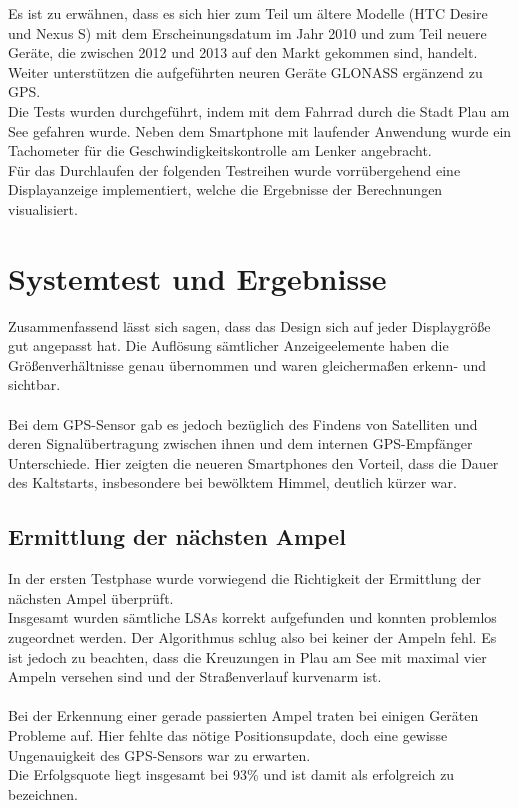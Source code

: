 Es ist zu erwähnen, dass es sich hier zum Teil um ältere Modelle (HTC Desire und Nexus S) mit dem Erscheinungsdatum im Jahr 2010 und zum Teil neuere Geräte, die zwischen 2012 und 2013 auf den Markt gekommen sind, handelt. Weiter unterstützen die aufgeführten neuren Geräte \gls{GLONASS} ergänzend zu \gls{GPS}.\\
Die Tests wurden durchgeführt, indem mit dem Fahrrad durch die Stadt Plau am See gefahren wurde. Neben dem \gls{Smartphone} mit laufender Anwendung wurde ein Tachometer für die Geschwindigkeitskontrolle am Lenker angebracht. \\
Für das Durchlaufen der folgenden Testreihen wurde vorrübergehend eine Displayanzeige implementiert, welche die Ergebnisse der Berechnungen visualisiert.
\section{Systemtest und Ergebnisse}
Zusammenfassend lässt sich sagen, dass das Design sich auf jeder Displaygröße gut angepasst hat. Die Auflösung sämtlicher Anzeigeelemente haben die Größenverhältnisse genau übernommen und waren gleichermaßen erkenn- und sichtbar.\\\\
Bei dem \gls{GPS}-Sensor gab es jedoch bezüglich des Findens von Satelliten und deren Signalübertragung zwischen ihnen und dem internen \gls{GPS}-Empfänger Unterschiede. Hier zeigten die neueren \glspl{Smartphone} den Vorteil, dass die Dauer des Kaltstarts, insbesondere bei bewölktem Himmel, deutlich kürzer war.
%
%
\subsection{Ermittlung der nächsten Ampel}
In der ersten Testphase wurde vorwiegend die Richtigkeit der Ermittlung der nächsten Ampel überprüft.\\
Insgesamt wurden sämtliche \glspl{LSA} korrekt aufgefunden und konnten problemlos zugeordnet werden. Der Algorithmus schlug also bei keiner der Ampeln fehl. Es ist jedoch zu beachten, dass die Kreuzungen in Plau am See mit maximal vier Ampeln versehen sind und der Straßenverlauf kurvenarm ist.\\\\
Bei der Erkennung einer gerade passierten Ampel traten bei einigen Geräten Probleme auf. Hier fehlte das nötige Positionsupdate, doch eine gewisse Ungenauigkeit des \gls{GPS}-Sensors war zu erwarten.\\ 
Die Erfolgsquote liegt insgesamt bei 93\% und ist damit als erfolgreich zu bezeichnen. 
%
%
